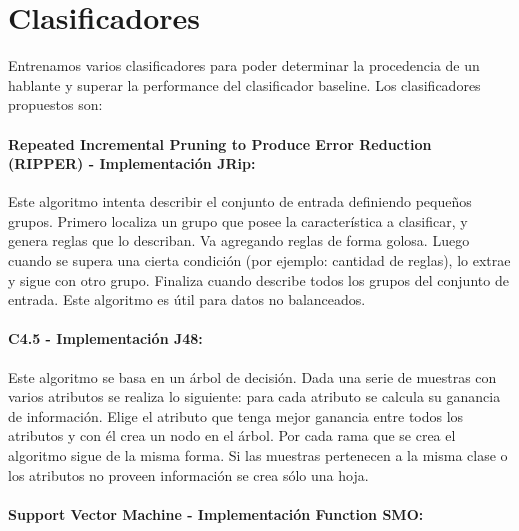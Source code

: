 \section{Clasificadores}

Entrenamos varios clasificadores para poder determinar la procedencia de un hablante y superar la performance del clasificador baseline. Los clasificadores propuestos son: 

\paragraph{Repeated Incremental Pruning to Produce Error Reduction (RIPPER) \cite{Cohen1995} - Implementación JRip:}


Este algoritmo intenta describir el conjunto de entrada definiendo pequeños grupos. Primero localiza un grupo que posee la característica a clasificar, y genera reglas que lo describan. Va agregando reglas de forma golosa. Luego cuando se supera una cierta condición (por ejemplo: cantidad de reglas), lo extrae y sigue con otro grupo. Finaliza cuando describe todos los grupos del conjunto de entrada. Este algoritmo es útil para datos no balanceados.

\paragraph{C4.5 \cite{Quinlan1993} - Implementación J48:}


Este algoritmo se basa en un árbol de decisión. Dada una serie de muestras con varios atributos se realiza lo siguiente: para cada atributo se calcula su ganancia de información. Elige el atributo que tenga mejor ganancia entre todos los atributos y con él crea un nodo en el árbol. Por cada rama que se crea el algoritmo sigue de la misma forma. Si las muestras pertenecen a la misma clase o los atributos no proveen información se crea sólo una hoja.

\paragraph{Support Vector Machine \cite{Platt98sequentialminimal} - Implementación Function SMO:}


